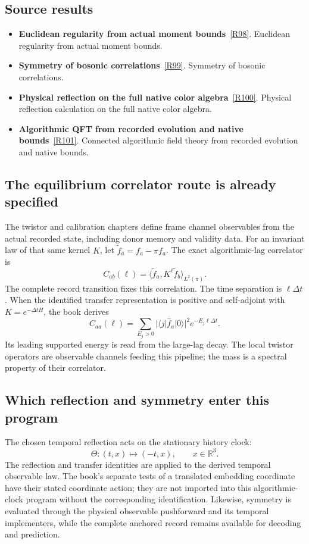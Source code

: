 \documentclass[11pt,a4paper]{article}
\begin{document}
\subsection*{Source results}
\begin{itemize}
\item \textbf{Euclidean regularity from actual moment bounds}~\hyperref[src:thm-os-os0-fg]{[R98]}. Euclidean regularity from actual moment bounds.
\item \textbf{Symmetry of bosonic correlations}~\hyperref[src:thm-os-os4-fg]{[R99]}. Symmetry of bosonic correlations.
\item \textbf{Physical reflection on the full native color algebra}~\hyperref[src:prop-ym-native-color-reflected-matrices]{[R100]}. Physical reflection calculation on the full native color algebra.
\item \textbf{Algorithmic QFT from recorded evolution and native bounds}~\hyperref[src:thm-ym-algorithmic-qft-synthesis]{[R101]}. Connected algorithmic field theory from recorded evolution and native bounds.
\end{itemize}
\subsection*{The equilibrium correlator route is already specified}
The twistor and calibration chapters define frame channel observables from the actual recorded state, including donor memory and validity data. For an invariant law of that same kernel \(K\), let \(\widetilde f_a=f_a-\pi f_a\). The exact algorithmic-lag correlator is
\[
C_{ab}(\ell)=\langle\widetilde f_a,K^\ell\widetilde f_b\rangle_{L^2(\pi)}.
\]
The complete record transition fixes this correlation. The time separation is \(\ell\Delta t\). When the identified transfer representation is positive and self-adjoint with \(K=e^{-\Delta tH}\), the book derives
\[
C_{aa}(\ell)=\sum_{E_j>0}
|\langle j|\widehat f_a|0\rangle|^2e^{-E_j\ell\Delta t}.
\]
Its leading supported energy is read from the large-lag decay. The local twistor operators are observable channels feeding this pipeline; the mass is a spectral property of their correlator.

\subsection*{Which reflection and symmetry enter this program}
The chosen temporal reflection acts on the stationary history clock:
\[
\Theta:(t,x)\mapsto(-t,x),\qquad x\in\mathbb R^3.
\]
The reflection and transfer identities are applied to the derived temporal observable law. The book's separate tests of a translated embedding coordinate have their stated coordinate action; they are not imported into this algorithmic-clock program without the corresponding identification. Likewise, symmetry is evaluated through the physical observable pushforward and its temporal implementers, while the complete anchored record remains available for decoding and prediction.
\end{document}
